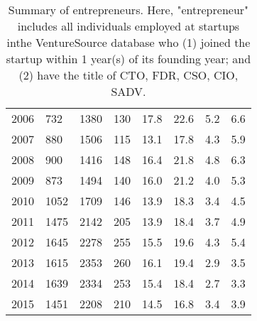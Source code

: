 \begin{table}[!htb]
\begin{tabular}{p{1.75cm}p{1.75cm}p{1.75cm}p{1.75cm}p{1.75cm}p{1.75cm}p{1.75cm}p{1.75cm}}
  2006 & 732 & 1380 & 130 & 17.8 & 22.6 & 5.2 & 6.6 \\ 
  2007 & 880 & 1506 & 115 & 13.1 & 17.8 & 4.3 & 5.9 \\ 
  2008 & 900 & 1416 & 148 & 16.4 & 21.8 & 4.8 & 6.3 \\ 
  2009 & 873 & 1494 & 140 & 16.0 & 21.2 & 4.0 & 5.3 \\ 
  2010 & 1052 & 1709 & 146 & 13.9 & 18.3 & 3.4 & 4.5 \\ 
  2011 & 1475 & 2142 & 205 & 13.9 & 18.4 & 3.7 & 4.9 \\ 
  2012 & 1645 & 2278 & 255 & 15.5 & 19.6 & 4.3 & 5.4 \\ 
  2013 & 1615 & 2353 & 260 & 16.1 & 19.4 & 2.9 & 3.5 \\ 
  2014 & 1639 & 2334 & 253 & 15.4 & 18.4 & 2.7 & 3.3 \\ 
  2015 & 1451 & 2208 & 210 & 14.5 & 16.8 & 3.4 & 3.9 \\ 
   \bottomrule
\end{tabular}
\endgroup
\caption{Summary of entrepreneurs. Here, "entrepreneur" includes all individuals employed at startups inthe VentureSource database who (1) joined the startup within 1 year(s) of its founding year; and (2) have the title of CTO, FDR, CSO, CIO, SADV.} 
\end{table}
